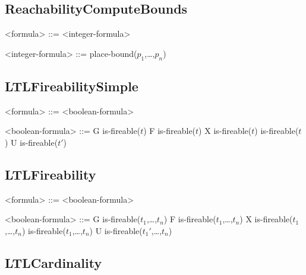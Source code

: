 \documentclass[10pt,english,a4paper]{article}
\begin{document}
\subsection{ReachabilityComputeBounds}

\begin{grammar}

<formula> ::= <integer-formula>

<integer-formula> ::= place-bound($p_1$,\dots,$p_n$)

\end{grammar}



\subsection{LTLFireabilitySimple}

\begin{grammar}

<formula> ::= <boolean-formula>

<boolean-formula> ::= G is-fireable($t$)
\alt F is-fireable($t$)
\alt X is-fireable($t$)
\alt is-fireable($t$) U is-fireable($t'$)

\end{grammar}


\subsection{LTLFireability}

\begin{grammar}

<formula> ::= <boolean-formula>

<boolean-formula> ::= G is-fireable($t_1$,\dots,$t_n$)
\alt F is-fireable($t_1$,\dots,$t_n$)
\alt X is-fireable($t_1$,\dots,$t_n$)
\alt is-fireable($t_1$,\dots,$t_n$) U is-fireable($t_1'$,\dots,$t_n$)

\end{grammar}

\subsection{LTLCardinality}
\end{document}
